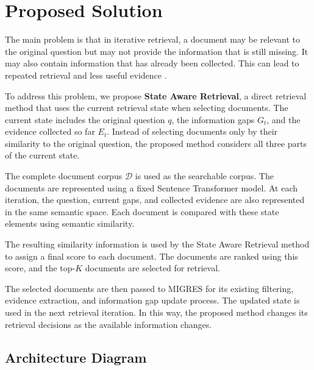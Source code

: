 \documentclass[12pt,a4paper]{report}
\begin{document}
\clearpage

\section{Proposed Solution}

The main problem is that in iterative retrieval, a document may be relevant to the original question but may not provide the information that is still missing. It may also contain information that has already been collected. This can lead to repeated retrieval and less useful evidence \cite{yadav2020iterative,pickett2024better,wang2025infogain}.

To address this problem, we propose \textbf{State Aware Retrieval}, a direct retrieval method that uses the current retrieval state when selecting documents. The current state includes the original question $q$, the information gaps $G_t$, and the evidence collected so far $E_t$. Instead of selecting documents only by their similarity to the original question, the proposed method considers all three parts of the current state.

The complete document corpus $\mathcal{D}$ is used as the searchable corpus. The documents are represented using a fixed Sentence Transformer model. At each iteration, the question, current gaps, and collected evidence are also represented in the same semantic space. Each document is compared with these state elements using semantic similarity.

The resulting similarity information is used by the State Aware Retrieval method to assign a final score to each document. The documents are ranked using this score, and the top-$K$ documents are selected for retrieval.

The selected documents are then passed to MIGRES for its existing filtering, evidence extraction, and information gap update process. The updated state is used in the next retrieval iteration. In this way, the proposed method changes its retrieval decisions as the available information changes.
\clearpage

\subsection{Architecture Diagram}
\end{document}
